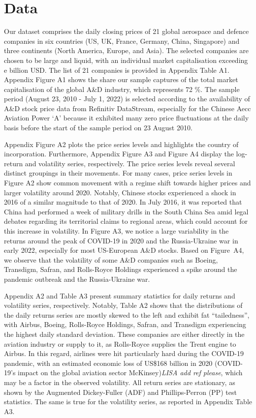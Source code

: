 \documentclass[
  letterpaper,
  DIV=11,
  numbers=noendperiod]{scrartcl}
\begin{document}
\hypertarget{data}{%
\section{Data}\label{data}}

Our dataset comprises the daily closing prices of 21 global aerospace
and defence companies in six countries (US, UK, France, Germany, China,
Singapore) and three continents (North America, Europe, and Asia). The
selected companies are chosen to be large and liquid, with an individual
market capitalisation exceeding e billion USD. The list of 21 companies
is provided in Appendix Table A1. Appendix Figure A1 shows the share our
sample captures of the total market capitalisation of the global A\&D
industry, which represents 72 \%. The sample period (August 23, 2010 -
July 1, 2022) is selected according to the availability of A\&D stock
price data from Refinitiv DataStream, especially for the Chinese Aecc
Aviation Power `A' because it exhibited many zero price fluctuations at
the daily basis before the start of the sample period on 23 August 2010.

Appendix Figure A2 plots the price series levels and highlights the
country of incorporation. Furthermore, Appendix Figure A3 and Figure A4
display the log-return and volatility series, respectively. The price
series levels reveal several distinct groupings in their movements. For
many cases, price series levels in Figure A2 show common movement with a
regime shift towards higher prices and larger volatility around 2020.
Notably, Chinese stocks experienced a shock in 2016 of a similar
magnitude to that of 2020. In July 2016, it was reported that China had
performed a week of military drills in the South China Sea amid legal
debates regarding its territorial claims to regional areas, which could
account for this increase in volatility. In Figure A3, we notice a large
variability in the returns around the peak of COVID-19 in 2020 and the
Russia-Ukraine war in early 2022, especially for most US-European A\&D
stocks. Based on Figure~A4, we observe that the volatility of some A\&D
companies such as Boeing, Transdigm, Safran, and Rolls-Royce Holdings
experienced a spike around the pandemic outbreak and the Russia-Ukraine
war.

Appendix A2 and Table A3 present summary statistics for daily returns
and volatility series, respectively. Notably, Table A2 shows that the
distributions of the daily returns series are mostly skewed to the left
and exhibit fat ``tailedness'', with Airbus, Boeing, Rolls-Royce
Holdings, Safran, and Transdigm experiencing the highest daily standard
deviation. These companies are either directly in the aviation industry
or supply to it, as Rolls-Royce supplies the Trent engine to Airbus. In
this regard, airlines were hit particularly hard during the COVID-19
pandemic, with an estimated economic loss of US\$168 billion in 2020
(COVID-19's impact on the global aviation sector \textbar{}
McKinsey)\emph{LISA add ref please}, which may be a factor in the
observed volatility. All return series are stationary, as shown by the
Augmented Dickey-Fuller (ADF) and Phillips-Perron (PP) test statistics.
The same is true for the volatility series, as reported in Appendix
Table A3.
\end{document}
